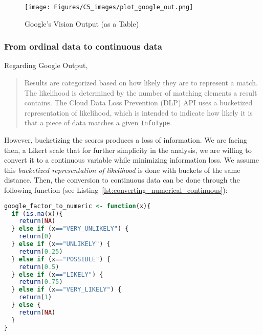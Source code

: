 \begin{figure}[H]
\centering
\texttt{[image: Figures/C5\_images/plot\_google\_out.png]}
\caption{Google's Vision Output (as a Table)}
\label{fig:G_output}
\end{figure}



\subsubsection{From ordinal data to continuous data}
Regarding Google Output, 
\blockquote{
Results are categorized based on how likely they are to represent a match. The likelihood is determined by the number of matching elements a result contains. The Cloud Data Loss Prevention (DLP) API uses a bucketized representation of likelihood, which is intended to indicate how likely it is that a piece of data matches a given \texttt{InfoType}.} \par
However, bucketizing the scores produces a loss of information.
We are facing then, a Likert scale that for further simplicity in the analysis, we are willing to convert it to a continuous variable while minimizing information loss. 
We assume this \textit{bucketized representation of likelihood} is done with buckets of the same distance. Then, the conversion to continuous data can be done through the following function (see Listing~\ref{lst:converting_numerical_continuous}):

\begin{lstlisting}[language={R}, frame={single}, label={lst:converting_numerical_continuous}, caption={R Code to convert the bucket values to numerical}]
google_factor_to_numeric <- function(x){
  if (is.na(x)){
    return(NA)
  } else if (x=="VERY_UNLIKELY") {
    return(0)
  } else if (x=="UNLIKELY") {
    return(0.25)
  } else if (x=="POSSIBLE") {
    return(0.5)
  } else if (x=="LIKELY") {
    return(0.75)
  } else if (x=="VERY_LIKELY") {
    return(1)
  } else {
    return(NA)
  }
}
\end{lstlisting}

